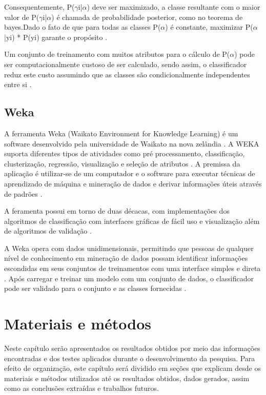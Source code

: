 \documentclass[
	12pt,				%
	oneside,			%
	a4paper,			%
	english,			%
	brazil				%
	]{abntex2ppgsi}
\begin{document}
Consequentemente, P($\gamma$i|$\alpha$)  deve ser maximizado, a classe resultante com o maior valor de P($\gamma$i|$\alpha$)  é chamada de probabilidade posterior, como no teorema de bayes.Dado o fato de que para todas as classes P($\alpha$) é constante, maximizar P($\alpha$|yi) * P(yi) garante o propósito \cite{ sharma2015}.

Um conjunto de treinamento com muitos atributos para o cálculo de P($\alpha$) pode ser computacionalmente custoso de ser calculado, sendo assim, o classificador reduz este custo assumindo que as classes são condicionalmente independentes entre si \cite{ sharma2015}.


\section{Weka}
A ferramenta Weka (Waikato Environment for Knowledge Learning) é um software desenvolvido pela universidade de Waikato na nova zelândia \cite{Subbulakshmi2012}.  A WEKA suporta diferentes tipos de atividades como pré processamento, classificação, clusterização, regressão, visualização e seleção de atributos \cite{Subbulakshmi2012}. A premissa da aplicação é utilizar-se de um computador e o software para executar técnicas de aprendizado de máquina e mineração de dados e derivar informações úteis através de padrões \cite{Subbulakshmi2012}.

A feramenta possui em torno de duas décacas, com  implementações dos algoritmos de classificação com interfaces gráficas de fácil uso e visualização além de algoritmos de validação \cite{Bouckaert2008}. 

A Weka opera com dados unidimensionais, permitindo que pessoas de qualquer nível de conhecimento em mineração de dados  possam identificar informações escondidas em seus conjuntos de treinamentos com uma interface simples e direta \cite{Subbulakshmi2012}.  Após carregar e treinar um modelo com um conjunto de dados, o classificador pode ser validado para o conjunto e as classes fornecidas \cite{Subbulakshmi2012}. 

\chapter{Materiais e métodos}
\label{chap:resultados}
Neste capítulo serão apresentados os resultados obtidos por meio das informações encontradas e dos testes aplicados durante o desenvolvimento da pesquisa. Para efeito de organização, este capítulo será dividido em seções que explicam desde os materiais e métodos utilizados até os resultados obtidos, dados gerados, assim como as conclusões extraídas e trabalhos futuros.
\end{document}
